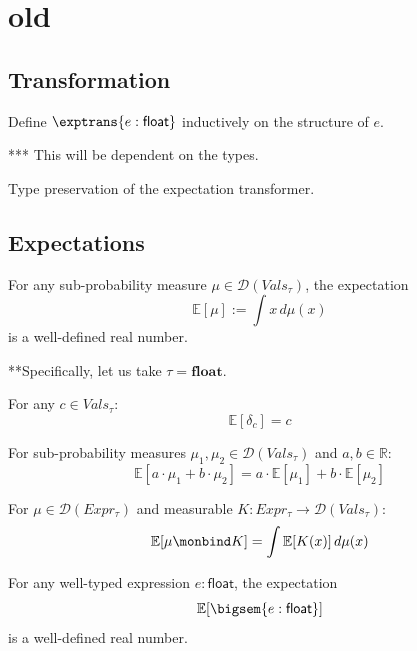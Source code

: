 \newpage
\section{old}
\subsection{Transformation}

\begin{definition}
  Define $\exptrans{e : \mathsf{float}}$ inductively on the structure of $e$.

  *** This will be dependent on the types.
\end{definition}

\begin{lemma}
  Type preservation of the expectation transformer.
\end{lemma}


\subsection{Expectations}

\begin{lemma}
  For any sub-probability measure $\mu \in \mathcal{D}(Vals_{\tau})$, the expectation
  \[
    \mathbb{E}[\mu] := \int x \, d\mu(x)
  \]
  is a well-defined real number.

  **Specifically, let us take $\tau = \mathbf{float}$.
\end{lemma}

\begin{lemma}
  For any $c \in Vals_{\tau}$:
  \[
    \mathbb{E}[\delta_c] = c
  \]
\end{lemma}

\begin{lemma}
  For sub-probability measures $\mu_1, \mu_2 \in \mathcal{D}(Vals_{\tau})$ and $a, b \in \mathbb{R}$:
  \[
    \mathbb{E}[a \cdot \mu_1 + b \cdot \mu_2] = a \cdot \mathbb{E}[\mu_1] + b \cdot \mathbb{E}[\mu_2]
  \]
\end{lemma}

\begin{lemma}
  For $\mu \in \mathcal{D}(Expr_\tau)$ and measurable $K : Expr_\tau \to \mathcal{D}(Vals_{\tau})$:
  \[
    \mathbb{E}[\mu \monbind K] = \int \mathbb{E}[K(x)] \, d\mu(x)
  \]
\end{lemma}

\begin{lemma}
  For any well-typed expression $e : \mathsf{float}$, the expectation
  \[
    \mathbb{E}[\bigsem{e : \mathsf{float}}] 
  \]
  is a well-defined real number.
\end{lemma}

